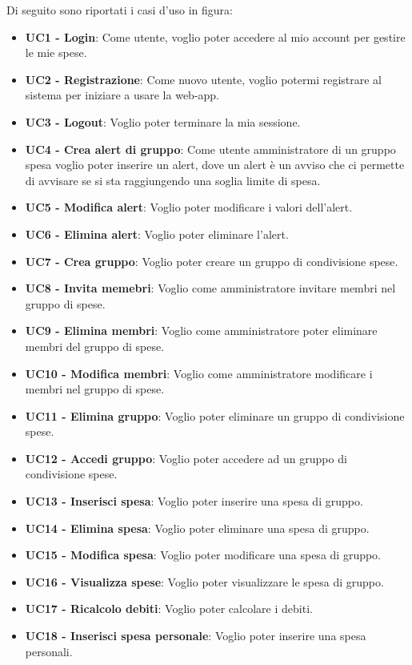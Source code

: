 Di seguito sono riportati i casi d'uso in figura:
\begin{itemize}
    \item \textbf{UC1 - Login}: Come utente, voglio poter accedere al mio account per gestire le mie spese.
    \item \textbf{UC2 - Registrazione}: Come nuovo utente, voglio potermi registrare al sistema per iniziare a usare la web-app.
    \item \textbf{UC3 - Logout}: Voglio poter terminare la mia sessione.
    \item \textbf{UC4 - Crea alert di gruppo}: Come utente amministratore di un gruppo spesa voglio poter inserire un alert, dove un alert è un avviso che ci permette di avvisare se si sta raggiungendo una soglia limite di spesa.
    \item \textbf{UC5 - Modifica alert}: Voglio poter modificare i valori dell'alert.
    \item \textbf{UC6 - Elimina alert}: Voglio poter eliminare l'alert. 
    \item \textbf{UC7 - Crea gruppo}: Voglio poter creare un gruppo di condivisione spese. 
    \item \textbf{UC8 - Invita memebri}: Voglio come amministratore invitare membri nel gruppo di spese.
    \item \textbf{UC9 - Elimina membri}: Voglio come amministratore poter eliminare membri del gruppo di spese.
    \item \textbf{UC10 - Modifica membri}: Voglio come amministratore modificare i membri nel gruppo di spese.
    \item \textbf{UC11 - Elimina gruppo}: Voglio poter eliminare un gruppo di condivisione spese. 
    \item \textbf{UC12 - Accedi gruppo}: Voglio poter accedere ad un gruppo di condivisione spese. 
    \item \textbf{UC13 - Inserisci spesa}: Voglio poter inserire una spesa di gruppo.
    \item \textbf{UC14 - Elimina spesa}: Voglio poter eliminare una spesa di gruppo.
    \item \textbf{UC15 - Modifica spesa}: Voglio poter modificare una spesa di gruppo.
    \item \textbf{UC16 - Visualizza spese}: Voglio poter visualizzare le spesa di gruppo.
    \item \textbf{UC17 - Ricalcolo debiti}: Voglio poter calcolare i debiti.
    \item \textbf{UC18 - Inserisci spesa personale}: Voglio poter inserire una spesa personali.

\end{itemize}
